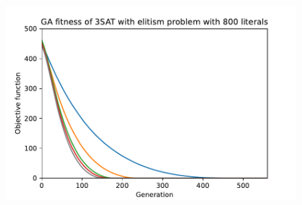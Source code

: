 \begin{figure}[ht!]
\begin{minipage}[t]{0.32\textwidth}
    \end{minipage}
    \hfill
    \begin{minipage}[t]{0.32\textwidth}
        \centering
        \includegraphics[width=\textwidth]{img/runs/fitness_ga_elitism_3SAT_d800.pdf}
    \end{minipage}


\end{figure}
